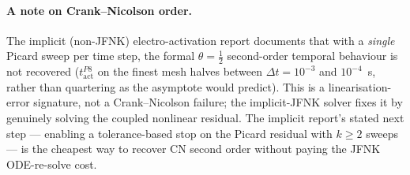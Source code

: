 \documentclass[11pt,a4paper]{article}
\newcommand{\tact}{t_{\text{act}}^{P8}}
\newcommand{\code}[1]{\texttt{\small #1}}
\begin{document}
\paragraph{A note on Crank--Nicolson order.}
The implicit (non-JFNK) electro-activation report documents that with
a \emph{single} Picard sweep per time step, the formal
$\theta = \tfrac{1}{2}$ second-order temporal behaviour is not
recovered (\code{$\tact$} on the finest mesh halves between
$\Delta t = 10^{-3}$ and $10^{-4}$~s, rather than quartering as the
asymptote would predict). This is a linearisation-error signature,
not a Crank--Nicolson failure; the implicit-JFNK solver fixes it by
genuinely solving the coupled nonlinear residual. The implicit
report's stated next step --- enabling a tolerance-based stop on the
Picard residual with $k \ge 2$ sweeps --- is the cheapest way to
recover CN second order without paying the JFNK ODE-re-solve cost.
\end{document}
